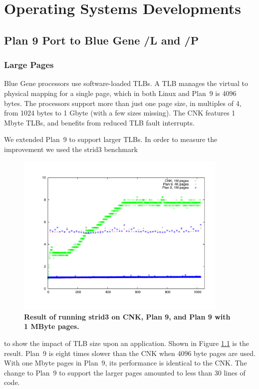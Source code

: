 \chapter{Operating Systems Developments}
\section{Plan 9 Port to Blue Gene /L and /P}
\subsection{Large Pages}
Blue Gene   processors use software-loaded TLBs. A TLB manages the virtual to physical mapping for a single page, which 
in both Linux and Plan~9 is 4096 bytes. The processors support more than just one page size, in multiples of 4, from 1024 bytes to 1 Gbyte (with a few sizes missing). 
The CNK 
features 1 Mbyte TLBs, and benefits from reduced TLB fault interrupts. 

We extended Plan~9 to support larger TLBs. In order to measure the improvement we used the strid3 benchmark
\begin{figure}[h]
\begin{center}
 \includegraphics[width=4in]{strid3.pdf}
 \caption{{\bf Result of running strid3 on CNK, Plan 9, and Plan 9 with 1 MByte pages. }}
\label{strid3}
\end{center}
\end{figure}
to show the impact of TLB size upon an application. Shown in Figure \ref{strid3} is the result. Plan~9 is 
eight times slower than the CNK when 4096 byte pages are used. With one Mbyte pages in Plan~9, its 
performance is identical to the CNK. 
The change to Plan~9 to support the larger pages amounted to less than 30 lines of code\cite{DBLP:journals/ife/MinnichM09}. 

